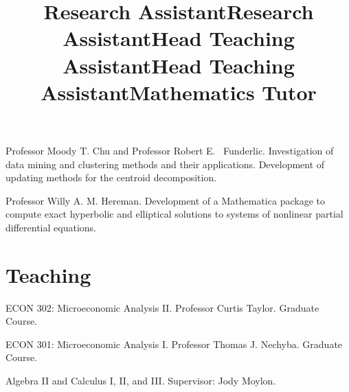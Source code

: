\documentclass[overlapped,line,draft,11pt,letterpaper]{res}
\begin{document}
\begin{resume}
\title{Research Assistant}
\begin{position}
  Professor Moody T. Chu and Professor Robert E. \
  Funderlic.  Investigation of data mining and clustering methods and
  their applications. Development of updating methods for the centroid
  decomposition.
\end{position}

\title{Research Assistant}
\begin{position}
  Professor Willy A. M. Hereman. Development of a Mathematica
  package to compute exact hyperbolic and elliptical solutions to
  systems of nonlinear partial differential equations.
\end{position}


\section{\bf Teaching}


\title{Head Teaching Assistant}
\begin{position}
  ECON 302: Microeconomic Analysis II. Professor Curtis Taylor.
  Graduate Course.
\end{position}

\title{Head Teaching Assistant}
\begin{position}
  ECON 301: Microeconomic Analysis I. Professor Thomas J. Nechyba.
  Graduate Course.
\end{position}

\newpage

\title{Mathematics Tutor}
\begin{position}
  Algebra II and Calculus I, II, and III.  Supervisor: Jody Moylon.
\end{position}


\end{resume}
\end{document}
